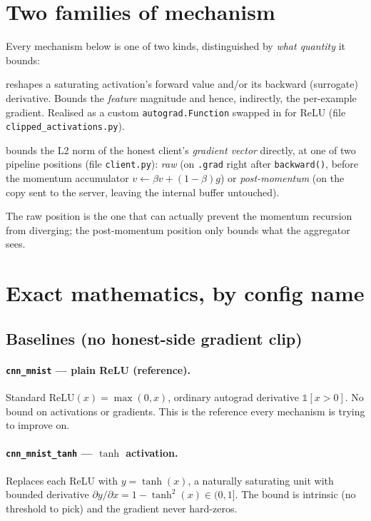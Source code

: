 \documentclass[11pt]{article}
\newcommand{\code}[1]{\texttt{#1}}
\begin{document}
\section{Two families of mechanism}
Every mechanism below is one of two kinds, distinguished by \emph{what quantity} it bounds:
\begin{description}\itemsep3pt
  \item[Activation-level] reshapes a saturating activation's forward value and/or its
    backward (surrogate) derivative. Bounds the \emph{feature} magnitude and hence,
    indirectly, the per-example gradient. Realised as a custom \code{autograd.Function}
    swapped in for ReLU (file \code{clipped\_activations.py}).
  \item[Gradient-level] bounds the L2 norm of the honest client's \emph{gradient vector}
    directly, at one of two pipeline positions (file \code{client.py}):
    \emph{raw} (on \code{.grad} right after \code{backward()}, before the momentum
    accumulator $v\!\leftarrow\!\beta v+(1-\beta)g$) or \emph{post-momentum} (on the copy
    sent to the server, leaving the internal buffer untouched).
\end{description}
The raw position is the one that can actually prevent the momentum recursion from diverging;
the post-momentum position only bounds what the aggregator sees.

\section{Exact mathematics, by config name}

\subsection{Baselines (no honest-side gradient clip)}
\paragraph{\code{cnn\_mnist} --- plain ReLU (reference).}
Standard $\mathrm{ReLU}(x)=\max(0,x)$, ordinary autograd derivative
$\mathbb{1}[x>0]$. No bound on activations or gradients. This is the reference every
mechanism is trying to improve on.

\paragraph{\code{cnn\_mnist\_tanh} --- $\tanh$ activation.}
Replaces each ReLU with $y=\tanh(x)$, a naturally saturating unit with bounded
derivative $\partial y/\partial x = 1-\tanh^2(x)\in(0,1]$. The bound is intrinsic
(no threshold to pick) and the gradient never hard-zeros.
\end{document}
